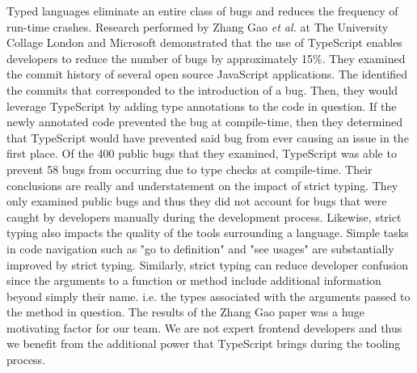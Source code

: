 \documentclass[12pt]{report}
\begin{document}
Typed languages eliminate an entire class of bugs and reduces the frequency of run-time crashes. Research performed by Zhang Gao \textit{et al.} at The University Collage London and Microsoft demonstrated that the use of TypeScript enables developers to reduce the number of bugs by approximately 15\%.\cite{typescriptpaper} They examined the commit history of several open source JavaScript applications. The identified the commits that corresponded to the introduction of a bug. Then, they would leverage TypeScript by adding type annotations to the code in question. If the newly annotated code prevented the bug at compile-time, then they determined that TypeScript would have prevented said bug from ever causing an issue in the first place. Of the 400 public bugs that they examined, TypeScript was able to prevent 58 bugs from occurring due to type checks at compile-time. Their conclusions are really and understatement on the impact of strict typing. They only examined public bugs and thus they did not account for bugs that were caught by developers manually during the development process. Likewise, strict typing also impacts the quality of the tools surrounding a language. Simple tasks in code navigation such as "go to definition" and "see usages" are substantially improved by strict typing. Similarly, strict typing can reduce developer confusion since the arguments to a function or method include additional information beyond simply their name. i.e. the types associated with the arguments passed to the method in question. The results of the Zhang Gao paper was a huge motivating factor for our team. We are not expert frontend developers and thus we benefit from the additional power that TypeScript brings during the tooling process.

\printbibliography[title={References}]
\end{document}
